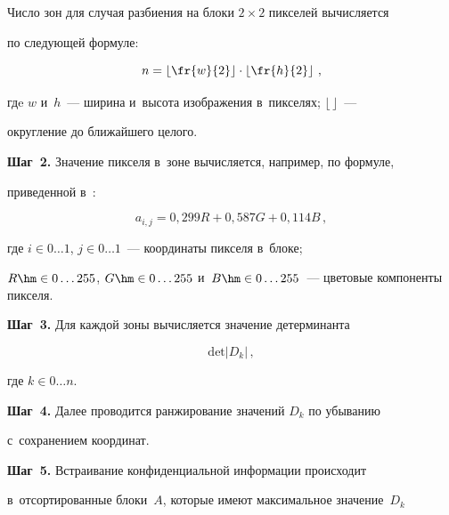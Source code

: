   Число зон для случая разбиения на блоки $2\times2$ пикселей вычисляется 


по следующей формуле:


  \begin{equation}


  n=\left\lfloor \fr{w}{2}\right\rfloor \cdot \left\lfloor \fr{h}{2}\right\rfloor\,,


  \end{equation}


гдe $w$ и~$h$~--- ширина и~высота изображения в~пикселях; $\lfloor\,\rfloor$~--- 


округление до ближайшего целого.


  


  \textbf{Шаг~2.} Значение пикселя в~зоне вычисляется, например, по формуле, 


приведенной в~\cite{10-lin}:


  \begin{equation}


  a_{i,j}=0{,}299 {R}+0{,}587 {G}+0{,}114 {B}\,,


  \end{equation}


где $i\in 0\ldots1$, $j\in 0\ldots 1$~--- координаты пикселя в~блоке;


${R}\hm\in 0\ldots 255$, ${G}\hm\in 0\ldots 255$ и~${B}\hm\in 


0\ldots 255$~--- цветовые компоненты пикселя.


  


  \textbf{Шаг~3.} Для каждой зоны вычисляется значение детерминанта


  \begin{equation*}


  \mathrm{det}\left\vert  D_k\right\vert\,,


  \end{equation*}


где $k\in 0\ldots n$.





  \textbf{Шаг~4.} Далее проводится ранжирование значений $D_k$ по убыванию 


с~сохранением координат.


  


  \textbf{Шаг~5.} Встраивание конфиденциальной информации происходит 


в~отсортированные блоки~$A$, которые имеют максимальное значение~$D_k$ 


